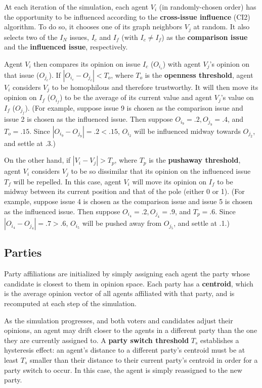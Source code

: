 At each iteration of the simulation, each agent $V_i$ (in randomly-chosen
order) has the opportunity to be influenced according to the
\textbf{cross-issue influence} (CI2) algorithm\cite{davies_agent-based_2023}.
To do so, it chooses one of its graph neighbors $V_j$ at random. It also
selects two of the $I_N$ issues, $I_c$ and $I_f$ (with $I_c \neq I_f$) as the
\textbf{comparison issue} and the \textbf{influenced issue}, respectively.

Agent $V_i$ then compares its opinion on issue $I_c$ ($O_{i_c}$) with agent
$V_j$'s opinion on that issue ($O_{j_c}$). If $|O_{i_c} - O_{j_c}| < T_o$,
where $T_o$ is the \textbf{openness threshold}, agent $V_i$ considers $V_j$ to
be homophilous and therefore trustworthy. It will then move its opinion on
$I_f$ ($O_{i_f}$) to be the average of its current value and agent $V_j$'s
value on $I_f$ ($O_{j_f}$). (For example, suppose issue 9 is chosen as the
comparison issue and issue 2 is chosen as the influenced issue. Then suppose
$O_{i_9} = .2, O_{j_9} = .4$, and $T_o = .15$. Since $|O_{i_9} - O_{j_9}| = .2
< .15$, $O_{i_2}$ will be influenced midway towards $O_{j_2}$, and settle at
.3.)

On the other hand, if $|V_i - V_j| > T_p$, where $T_p$ is the \textbf{pushaway
threshold}, agent $V_i$ considers $V_j$ to be so dissimilar that its opinion on
the influenced issue $T_f$ will be repelled. In this case, agent $V_i$ will
move its opinion on $I_f$ to be midway between its current position and that of
the pole (either 0 or 1). (For example, suppose issue 4 is chosen as the
comparison issue and issue 5 is chosen as the influenced issue. Then suppose
$O_{i_4} = .2, O_{j_4} = .9$, and $T_p = .6$. Since $|O_{i_4} - O_{j_4}| = .7
> .6$, $O_{i_5}$ will be pushed away from $O_{j_5}$, and settle at .1.)

\subsection{Parties}

Party affiliations are initialized by simply assigning each agent the party
whose candidate is closest to them in opinion space. Each party has a
\textbf{centroid}, which is the average opinion vector of all agents
affiliated with that party, and is recomputed at each step of the simulation.

As the simulation progresses, and both voters and candidates adjust their
opinions, an agent may drift closer to the agents in a different party than the
one they are currently assigned to. A \textbf{party switch threshold} $T_s$
establishes a hysteresis effect: an agent's distance to a different party's
centroid must be at least $T_s$ smaller than their distance to their current
party's centroid in order for a party switch to occur. In this case, the agent
is simply reassigned to the new party. 



